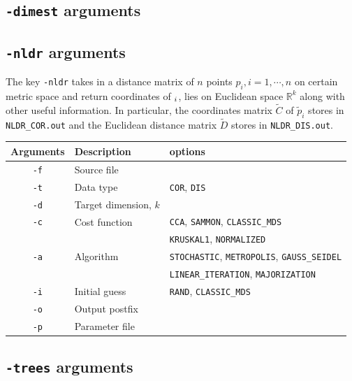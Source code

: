 \documentclass[11pt,a4paper]{article}
\theoremstyle{definition}
\theoremstyle{definition}
\numberwithin{equation}{section}
\begin{document}
	\subsection{\texttt{-dimest} arguments}
	
	\clearpage
	
	\subsection{\texttt{-nldr} arguments}
	
	The key \texttt{-nldr} takes in a distance matrix of $n$ points $p_i, i =1,\cdots, n$ on certain metric space and return coordinates of $\title{p}_i$, lies on Euclidean space $\mathbb{R}^k$ along with other useful information. In particular, the coordinates matrix $\tilde{C}$ of $\tilde{p}_i$ stores in \texttt{NLDR\_COR.out} and the Euclidean distance matrix $\tilde{D}$ stores in \texttt{NLDR\_DIS.out}.
	
	\begin{table}[!h]
		\centering
		\begin{tabular}{cll}
			\hline
			Arguments & Description & options\\
			\hline
			\texttt{-f}& Source file &  \\
			\hline
			\texttt{-t}& Data type & \texttt{COR}, \texttt{DIS}\\
			\hline
			\texttt{-d}& Target dimension, $k$&\\
			\hline
			\texttt{-c}& Cost function& \texttt{CCA}, \texttt{SAMMON}, \texttt{CLASSIC\_MDS}\\
			&&\texttt{KRUSKAL1}, \texttt{NORMALIZED}\\
			\hline
			\texttt{-a}& Algorithm & \texttt{STOCHASTIC}, \texttt{METROPOLIS}, \texttt{GAUSS\_SEIDEL}\\
			&&\texttt{LINEAR\_ITERATION}, \texttt{MAJORIZATION}\\
			\hline
			\texttt{-i}& Initial guess & \texttt{RAND}, \texttt{CLASSIC\_MDS}\\
			\hline
			\texttt{-o}& Output postfix&\\
			\hline
			\texttt{-p}& Parameter file&\\
			\hline
		\end{tabular}
	\end{table}
	
	\clearpage
	
	\subsection{\texttt{-trees} arguments}
	
\end{document}

